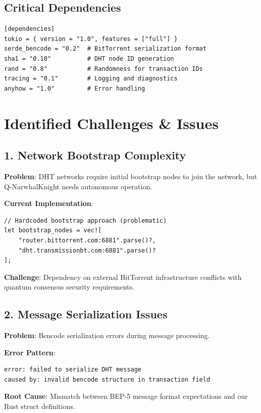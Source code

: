 \documentclass[11pt,a4paper]{article}
\begin{document}
\subsection{Critical Dependencies}

\begin{lstlisting}
[dependencies]
tokio = { version = "1.0", features = ["full"] }
serde_bencode = "0.2"  # BitTorrent serialization format
sha1 = "0.10"          # DHT node ID generation
rand = "0.8"           # Randomness for transaction IDs
tracing = "0.1"        # Logging and diagnostics
anyhow = "1.0"         # Error handling
\end{lstlisting}

\section{Identified Challenges \& Issues}

\subsection{1. Network Bootstrap Complexity}

\textbf{Problem}: DHT networks require initial bootstrap nodes to join the network, but Q-NarwhalKnight needs autonomous operation.

\textbf{Current Implementation}:
\begin{lstlisting}
// Hardcoded bootstrap approach (problematic)
let bootstrap_nodes = vec![
    "router.bittorrent.com:6881".parse()?,
    "dht.transmissionbt.com:6881".parse()?
];
\end{lstlisting}

\textbf{Challenge}: Dependency on external BitTorrent infrastructure conflicts with quantum consensus security requirements.

\subsection{2. Message Serialization Issues}

\textbf{Problem}: Bencode serialization errors during message processing.

\textbf{Error Pattern}:
\begin{lstlisting}
error: failed to serialize DHT message
caused by: invalid bencode structure in transaction field
\end{lstlisting}

\textbf{Root Cause}: Mismatch between BEP-5 message format expectations and our Rust struct definitions.
\end{document}
